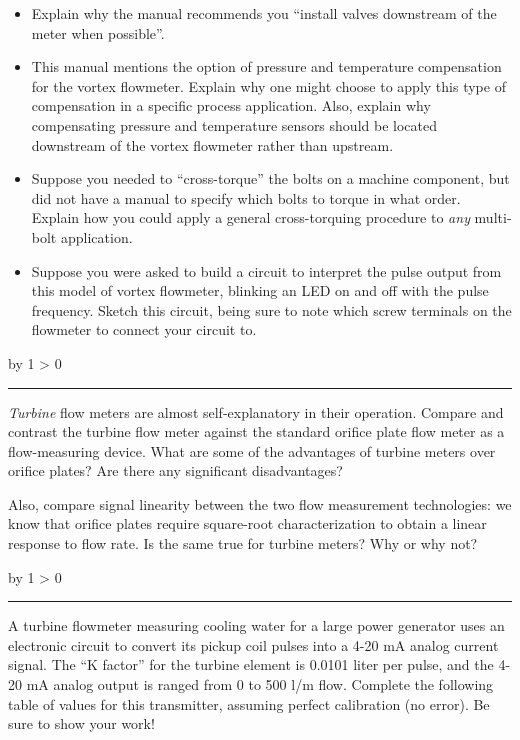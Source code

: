 \documentclass[12pt,a4paper]{article}
\def\oppgave{
            \advance\questnum by 1
            \ifnum \questnum > 0
                 \hrule
                 \vskip 3pt
                 \leftline{Oppgave \the\questnum}
                 \vskip 3pt \fi}
\begin{document}
\begin{itemize}
\item{} Explain why the manual recommends you ``install valves downstream of the meter when possible''.
\item{} This manual mentions the option of pressure and temperature compensation for the vortex flowmeter.  Explain why one might choose to apply this type of compensation in a specific process application.  Also, explain why compensating pressure and temperature sensors should be located downstream of the vortex flowmeter rather than upstream.
\item{} Suppose you needed to ``cross-torque'' the bolts on a machine component, but did not have a manual to specify which bolts to torque in what order.  Explain how you could apply a general cross-torquing procedure to {\it any} multi-bolt application.
\item{} Suppose you were asked to build a circuit to interpret the pulse output from this model of vortex flowmeter, blinking an LED on and off with the pulse frequency.  Sketch this circuit, being sure to note which screw terminals on the flowmeter to connect your circuit to.
\end{itemize}

\vskip 10pt \filbreak 
\oppgave{} 

{\it Turbine} flow meters are almost self-explanatory in their operation.  Compare and contrast the turbine flow meter against the standard orifice plate flow meter as a flow-measuring device.  What are some of the advantages of turbine meters over orifice plates?  Are there any significant disadvantages?  

Also, compare signal linearity between the two flow measurement technologies: we know that orifice plates require square-root characterization to obtain a linear response to flow rate.  Is the same true for turbine meters?  Why or why not?

\vskip 10pt \filbreak 
\oppgave{} 

A turbine flowmeter measuring cooling water for a large power generator uses an electronic circuit to convert its pickup coil pulses into a 4-20 mA analog current signal.  The ``K factor'' for the turbine element is 0.0101 liter per pulse, and the 4-20 mA analog output is ranged from 0 to 500 l/m flow.  Complete the following table of values for this transmitter, assuming perfect calibration (no error).  Be sure to show your work!
\end{document}
